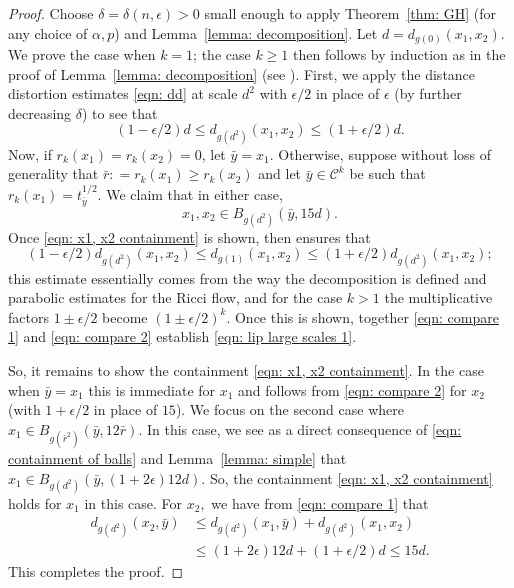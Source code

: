 \documentclass[11pt,reqno]{amsart}
\theoremstyle{remark}
\theoremstyle{definition}
\numberwithin{equation}{section}
\newcommand{\e}{{\epsilon}}
\begin{document}
\begin{proof}
Choose $\delta=\delta(n, \e) >0$ small enough to apply Theorem~\ref{thm: GH} (for any choice of $\alpha, p$) and Lemma~\ref{lemma: decomposition}.
Let $d = d_{g(0)}(x_1, x_2)$. 
	We prove the case when $k=1$; the case $k\ge 1$ then follows by induction as in the proof of Lemma~\ref{lemma: decomposition} (see \cite[Theorem 5.1]{LNN1}). 
	First, we apply the distance distortion estimates \eqref{eqn: dd} at scale $d^2$ with $\e/2$  in place of $\e$ (by further decreasing $\delta$) to see that 
	\begin{equation}\label{eqn: compare 1}
		(1-\e/2)d \leq d_{g(d^2)}(x_1,x_2)\leq (1+\e/2)d .
	\end{equation}
Now, if $r_k(x_1) = r_k(x_2) = 0$, let $\bar y = x_1$. Otherwise, suppose without loss of generality that $\bar{r}: = r_k(x_1) \geq r_k(x_2)$ and let $\bar y\in \mathcal{C}^k$ be such that $r_k(x_1)=t_{\bar y}^{1/2}.$ We  claim that in either case,
	\begin{equation}\label{eqn: x1, x2 containment}
		x_1,x_2 \in B_{g(d^2)}(\bar y, 15d).
	\end{equation}
	Once \eqref{eqn: x1, x2 containment} is shown, then \cite[Proposition~5.6(2)]{LNN1} ensures that 
\begin{equation}\label{eqn: compare 2}
	(1-\e/2) d_{g(d^2)}(x_1,x_2) \leq d_{g(1)}(x_1,x_2)
	\leq (1+\e/2) d_{g(d^2)}(x_1,x_2);
\end{equation}
this estimate  essentially comes from the way the decomposition is defined and parabolic estimates for the Ricci flow, and for the case $k>1$ the multiplicative factors $1 \pm \e/2$ become $(1\pm\e/2)^k$. Once this is shown, together \eqref{eqn: compare 1} and \eqref{eqn: compare 2} establish \eqref{eqn: lip large scales 1}.


So, it remains to show the containment \eqref{eqn: x1, x2 containment}. In the case when $\bar y=x_1$ this is immediate for $x_1$ and follows from \eqref{eqn: compare 2} for $x_2$ (with $1+\e/2$ in place of $15$). We focus on the second case where $x_1 \in B_{g(\bar{r}^2)}( \bar y , 12 \bar r).$
 In this case, we see as a direct consequence of \eqref{eqn: containment of balls} and Lemma~\ref{lemma: simple} that $x_1 \in B_{g(d^2)}(\bar y, (1+2\e)12 d)$.  So, the containment \eqref{eqn: x1, x2 containment} holds for $x_1$ in this case. For $x_2,$ we have from \eqref{eqn: compare 1} that 
	\begin{align*}
	d_{g(d^2)}(x_2,\bar y) & \leq d_{g(d^2)}(x_1, \bar y) + d_{g(d^2)}(x_1,x_2)\\
	& \leq 	 (1+2\e) 12 d + (1+\e/2)d \leq 15 d.
	\end{align*}
This completes the proof. 
\end{proof}
\end{document}
